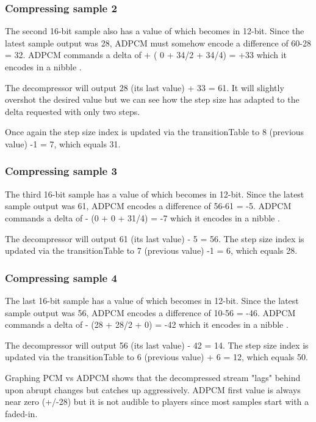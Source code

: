 \subsubsection{Compressing sample 2}
The second 16-bit sample also has a value of  which becomes  in 12-bit. Since the latest sample output was 28, ADPCM must somehow encode a difference of 60-28 = 32. ADPCM commands a delta of + ( 0 + 34/2 + 34/4) = +33 which it encodes in a nibble . 

The decompressor will output 28 (its last value) + 33 = 61. It will slightly overshot the desired value but we can see how the step size has adapted to the delta requested with only two steps. 

Once again the step size index is updated via the transitionTable to 8 (previous value) -1 = 7, which equals 31.

\subsubsection{Compressing sample 3}
The third 16-bit sample has a value of  which becomes  in 12-bit. Since the latest sample output was 61, ADPCM encodes a difference of 56-61 = -5. ADPCM commands a delta of - (0 + 0 + 31/4) = -7 which it encodes in a nibble . 

The decompressor will output 61 (its last value) - 5 = 56. The step size index is updated via the transitionTable to 7 (previous value) -1 = 6, which equals 28.

\subsubsection{Compressing sample 4}
The last 16-bit sample has a value of  which becomes  in 12-bit. Since the latest sample output was 56, ADPCM encodes a difference of 10-56 = -46. ADPCM commands a delta of - (28 + 28/2 + 0) = -42 which it encodes in a nibble . 

The decompressor will output 56 (its last value) - 42 = 14. The step size index is updated via the transitionTable to 6 (previous value) + 6 = 12, which equals 50.

Graphing PCM vs ADPCM shows that the decompressed stream "lags" behind upon abrupt changes but catches up aggressively. ADPCM first value is always near zero (+/-28) but it is not audible to players since most samples start with a faded-in. 

